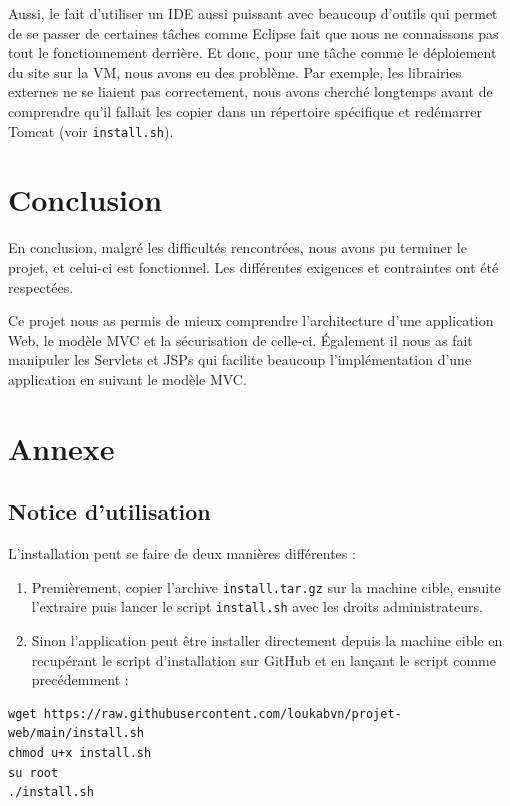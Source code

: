 Aussi, le fait d'utiliser un IDE aussi puissant avec beaucoup d'outils qui permet de se passer de
certaines tâches comme Eclipse fait que nous ne connaissons pas tout le fonctionnement derrière.
Et donc, pour une tâche comme le déploiement du site sur la VM, nous avons eu des problème. Par
exemple, les librairies externes ne se liaient pas correctement, nous avons cherché longtemps
avant de comprendre qu'il fallait les copier dans un répertoire spécifique et redémarrer Tomcat
(voir \verb:install.sh:).


\chapter{Conclusion}
En conclusion, malgré les difficultés rencontrées, nous avons pu terminer le projet, et celui-ci
est fonctionnel. Les différentes exigences et contraintes ont été respectées.

Ce projet nous as permis de mieux comprendre l'architecture d'une application Web, le modèle
MVC et la sécurisation de celle-ci. Également il nous as fait manipuler les Servlets et JSPs
qui facilite beaucoup l'implémentation d'une application en suivant le modèle MVC.

\chapter{Annexe}

\section{Notice d'utilisation}

L'installation peut se faire de deux manières différentes :

\begin{enumerate}
    \item Premièrement, copier l'archive \verb:install.tar.gz: sur la machine cible, ensuite
        l'extraire puis lancer le script \verb:install.sh: avec les droits administrateurs.

    \item Sinon l'application peut être installer directement depuis la machine cible en recupérant
        le script d'installation sur GitHub et en lançant le script comme precédemment :
\end{enumerate}

\begin{verbatim}
wget https://raw.githubusercontent.com/loukabvn/projet-web/main/install.sh
chmod u+x install.sh
su root
./install.sh
\end{verbatim}


